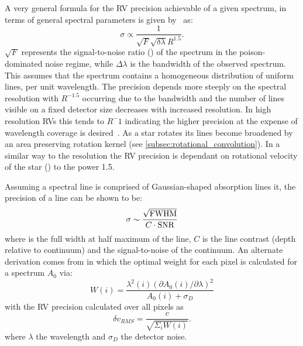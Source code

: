 A very general formula for the RV precision achievable of a given  spectrum, in terms of general spectral parameters is given by~\citet{hatzes_spectrograph_1992} as:
\begin{equation}
\sigma \propto \frac{1}{\sqrt{F} \sqrt{\delta \lambda} R^{1.5}}.
\end{equation}
$\sqrt{F}$ represents the signal-to-noise ratio (\snr{}) of the spectrum in the poison-dominated noise regime, while $\Delta \lambda$ is the bandwidth of the observed spectrum. This assumes that the spectrum contains a homogeneous distribution of uniform lines, per unit wavelength.
The precision depends more steeply on the spectral resolution with $R^{-1.5}$ occurring due  to the bandwidth and the number of lines visible on  a fixed detector size decreases with increased resolution.
In high resolution RVs this tends to $R^-{1}$ indicating the higher precision at the expense of wavelength coverage is desired~\citet{hatzes_spectrograph_1992}.
As a star rotates its lines become broadened by an area preserving rotation kernel (see \cref{subsec:rotational_convolution}).
In a similar way to the resolution the RV precision is dependant on rotational velocity of the star (\Vsini) to the power 1.5.

Assuming a spectral line is comprised of Gaussian-shaped absorption lines it, the precision of a line can be shown to be:
\begin{equation}
    \sigma \sim \frac{\sqrt{\textrm{FWHM}{}}}{C \cdot \textrm{SNR}}
\end{equation}
where \fwhm{} is the full width at half maximum of the line, $C$ is the line contrast (depth relative to continuum) and \snr{} the signal-to-noise of the continuum.
An alternate derivation comes from \citet{bouchy_fundamental_2001} in which the optimal weight for each pixel is calculated for a spectrum $A_0$ via:
\begin{equation}
    W(i) = \frac{\lambda^{2}(i) {(\partial A_0(i)/\partial\lambda)}^{2}}{A_0(i) + \sigma_D} \label{eqn:pixel_weigth}
\end{equation}
with the RV precision calculated over all pixels as
\begin{equation}
    \delta v_{RMS} = \frac{c}{\sqrt{\Sigma_i W(i)}}.
\end{equation}
where $\lambda$ the wavelength and $\sigma_D$ the detector noise.

